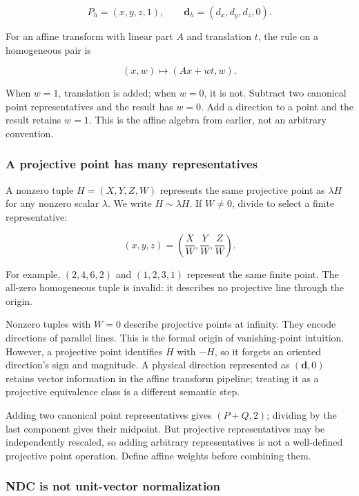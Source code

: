 \[
P_h=(x,y,z,1),\qquad \mathbf d_h=(d_x,d_y,d_z,0).
\]

For an affine transform with linear part \(A\) and translation \(t\), the rule on a homogeneous pair is

\[
(x,w)\longmapsto(Ax+wt,w).
\]

When \(w=1\), translation is added; when \(w=0\), it is not. Subtract two canonical point representatives and the result has \(w=0\). Add a direction to a point and the result retains \(w=1\). This is the affine algebra from earlier, not an arbitrary convention.

\subsubsection{A projective point has many representatives}\label{01-foundations-i-ch018-a-projective-point-has-many-representatives}

\hypertarget{01-foundations-i-ch018-a-projective-point-has-many-representatives}{}

A nonzero tuple \(H=(X,Y,Z,W)\) represents the same projective point as \(\lambda H\) for any nonzero scalar \(\lambda\). We write \(H\sim\lambda H\). If \(W\ne0\), divide to select a finite representative:

\[
(x,y,z)=\left(\frac XW,\frac YW,\frac ZW\right).
\]

For example, \((2,4,6,2)\) and \((1,2,3,1)\) represent the same finite point. The all-zero homogeneous tuple is invalid: it describes no projective line through the origin.

Nonzero tuples with \(W=0\) describe projective points at infinity. They encode directions of parallel lines. This is the formal origin of vanishing-point intuition. However, a projective point identifies \(H\) with \(-H\), so it forgets an oriented direction's sign and magnitude. A physical direction represented as \((\mathbf d,0)\) retains vector information in the affine transform pipeline; treating it as a projective equivalence class is a different semantic step.

Adding two canonical point representatives gives \((P+Q,2)\); dividing by the last component gives their midpoint. But projective representatives may be independently rescaled, so adding arbitrary representatives is not a well-defined projective point operation. Define affine weights before combining them.

\subsubsection{NDC is not unit-vector normalization}\label{01-foundations-i-ch018-ndc-is-not-unit-vector-normalization}

